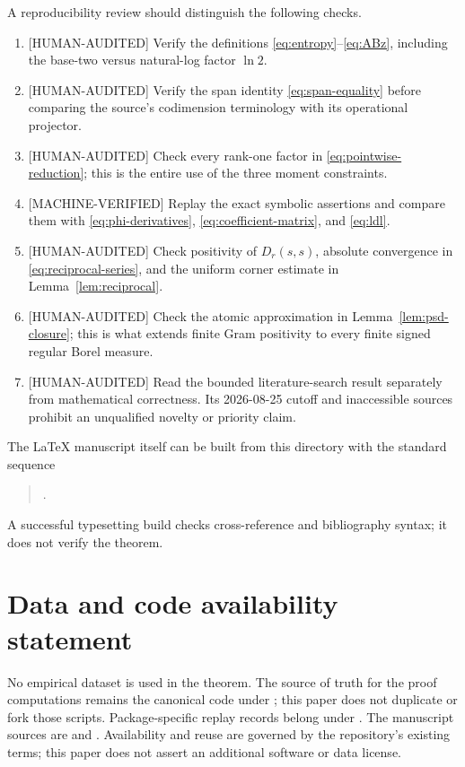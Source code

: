 \documentclass[11pt]{article}
\theoremstyle{plain}
\theoremstyle{definition}
\theoremstyle{remark}
\newcommand{\status}[1]{\textnormal{\textsf{\footnotesize[#1]}}}
\newcommand{\MachineVerified}{\status{MACHINE-VERIFIED}}
\newcommand{\HumanAudited}{\status{HUMAN-AUDITED}}
\begin{document}
A reproducibility review should distinguish the following checks.
\begin{enumerate}[label=\textbf{R\arabic*.}]
  \item \HumanAudited{} Verify the definitions
        \eqref{eq:entropy}--\eqref{eq:ABz}, including the base-two versus
        natural-log factor \(\ln2\).
  \item \HumanAudited{} Verify the span identity
        \eqref{eq:span-equality} before comparing the source's codimension
        terminology with its operational projector.
  \item \HumanAudited{} Check every rank-one factor in
        \eqref{eq:pointwise-reduction}; this is the entire use of the three
        moment constraints.
  \item \MachineVerified{} Replay the exact symbolic assertions and compare
        them with \eqref{eq:phi-derivatives}, \eqref{eq:coefficient-matrix},
        and \eqref{eq:ldl}.
  \item \HumanAudited{} Check positivity of \(D_r(s,s)\), absolute convergence
        in \eqref{eq:reciprocal-series}, and the uniform corner estimate in
        Lemma~\ref{lem:reciprocal}.
  \item \HumanAudited{} Check the atomic approximation in
        Lemma~\ref{lem:psd-closure}; this is what extends finite Gram
        positivity to every finite signed regular Borel measure.
  \item \HumanAudited{} Read the bounded literature-search result separately
        from mathematical correctness.  Its 2026-08-25 cutoff and inaccessible
        sources prohibit an unqualified novelty or priority claim.
\end{enumerate}

The LaTeX manuscript itself can be built from this directory with the standard
sequence
\begin{quote}\small
{}\quad
{}\quad
{}\quad
{}.
\end{quote}
A successful typesetting build checks cross-reference and bibliography syntax;
it does not verify the theorem.

\section{Data and code availability statement}
\label{app:data-code}

No empirical dataset is used in the theorem.  The source of truth for the
proof computations remains the canonical code under ; this
paper does not duplicate or fork those scripts.  Package-specific replay
records belong under .  The manuscript sources are
 and .  Availability and reuse are governed by
the repository's existing terms; this paper does not assert an additional
software or data license.
\end{document}
